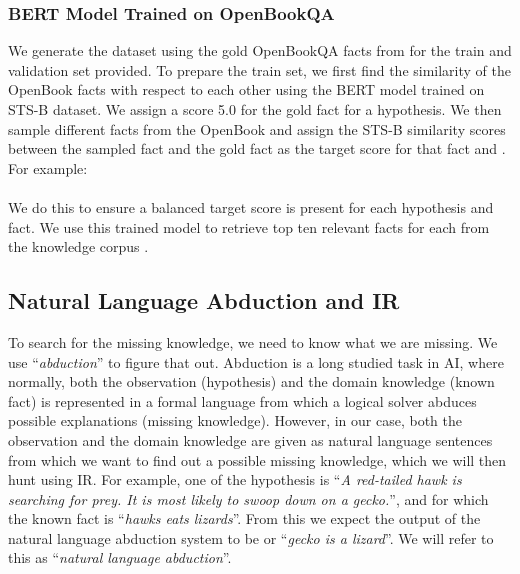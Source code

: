 \documentclass[11pt,a4paper]{article}
\begin{document}
\subsubsection{BERT Model Trained on OpenBookQA}
\label{bbc}
 We generate the dataset using the gold OpenBookQA facts from  for the train and validation set provided. To prepare the train set, we first find the similarity of the OpenBook  facts with respect to each other using the BERT model trained on STS-B dataset. We assign a score 5.0 for the gold  fact for a hypothesis. We then sample different facts from the OpenBook and assign the STS-B similarity scores between the sampled fact and the gold fact  as the target score for that fact  and . For example:\\

 \noindent
 \\
 
 We do this to ensure a balanced target score is present for each hypothesis and fact. We use this trained model to retrieve top ten relevant facts for each  from the knowledge corpus . 

\subsection{Natural Language Abduction and IR}
To search for the missing knowledge, we need to know what we are missing. We use ``\textit{abduction}'' to figure that out.
Abduction is a long studied task in AI, where normally, both the observation (hypothesis) and the domain knowledge (known fact) is represented in a formal language from which a logical solver abduces possible explanations (missing knowledge). However, in our case, both the observation and the domain knowledge are given as natural language sentences from which we want to find out a possible missing knowledge, which we will then hunt using IR. For example, one of the hypothesis  is ``\textit{A red-tailed hawk is searching for prey. It is most likely to swoop down on a gecko.}'', and for which the known fact  is ``\textit{hawks eats lizards}''. From this we expect the output of the natural language abduction system to be  or ``\textit{gecko is a lizard}''. We will refer to this as ``\textit{natural language abduction}''. 
\end{document}
